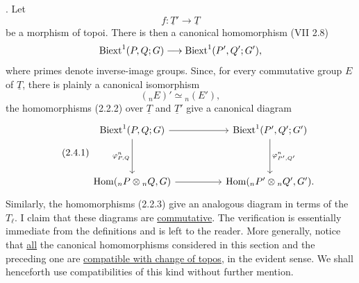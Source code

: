 
\medskip
{}.  Let
\[
 f:\underline T'\longrightarrow\underline T
\]
be a morphism of topoi.  There is then a canonical homomorphism
(VII 2.8)
\[
 \operatorname{Biext}^1(P,Q;G)\longrightarrow\operatorname{Biext}^1(P',Q';G'),
\]
where primes denote inverse-image groups.  Since, for every
commutative group $E$ of $\underline T$, there is plainly a canonical
isomorphism
\[
 ({}_nE)'\simeq{}_n(E'),
\]
the homomorphisms (2.2.2) over $\underline T$ and $\underline T'$ give
a canonical diagram
\begin{equation}\tag{2.4.1}
\begin{tikzcd}[column sep=huge,row sep=huge]
 \Biext^1(P,Q;G)\arrow[r]\arrow[d,"{\varphi^n_{P,Q}}"']
   &\Biext^1(P',Q';G')\arrow[d,"{\varphi^n_{P',Q'}}"]\\
 \Hom({}_nP\otimes{}_nQ,G)\arrow[r]
   &\Hom({}_nP'\otimes{}_nQ',G').
\end{tikzcd}
\end{equation}
Similarly, the homomorphisms (2.2.3) give an analogous diagram in
terms of the $T_\ell$.  I claim that these diagrams are
\underline{commutative}.  The verification is essentially immediate
from the definitions and is left to the reader.  More generally,
notice that \underline{all} the canonical homomorphisms considered in
this section and the preceding one are \underline{compatible with
change of topos}, in the evident sense.  We shall henceforth use
compatibilities of this kind without further mention.

